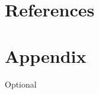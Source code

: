 \documentclass[11pt,letterpaper]{article}
\begin{document}


\section*{References}


\cite{chen2023,garcia2022,johnson2023,lee2021,smith2022}
\printbibliography[heading=none]

\section*{Appendix}
Optional
\end{document}
